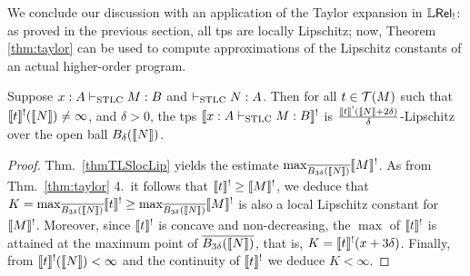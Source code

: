%
%
%


We conclude our discussion with an application of the Taylor expansion in $\mathbb{L} \mathsf{Rel}_{!}$: as proved in the previous section, all tps are locally Lipschitz; now, Theorem \ref{thm:taylor} can be used to compute approximations of the Lipschitz constants of an actual higher-order program.

\begin{corollary}\label{cor:taylor}
Suppose $x: A \vdash_{\mathrm{STLC}}M:B$ and $\vdash_{\mathrm{STLC}} N:A$. 
Then for all $t\in \mathcal{T}(M)$ such that $\llbracket t\rrbracket^{!}(\llbracket N\rrbracket)\neq \infty$, and $\delta>0$, the tps $\llbracket x:A\vdash_{\mathrm{STLC}}M:B\rrbracket^{!}$ is $\frac{\llbracket t\rrbracket^{!}(\llbracket N\rrbracket+2\delta)}{\delta}$-Lipschitz over the open ball
 $B_{\delta}(\llbracket N\rrbracket)$.
\end{corollary}
\begin{proof}
Thm.~\ref{thmTLSlocLip} yields the estimate $\max_{\overline{B_{3\delta}(\llbracket N\rrbracket)}}\llbracket M\rrbracket^{!}$. As from Thm.~\ref{thm:taylor} 4.~it follows that $\llbracket t\rrbracket^{!}\geq \llbracket M\rrbracket^{!}$, we deduce that $K=\max_{\overline{B_{3\delta}(\llbracket N\rrbracket)}}\llbracket t\rrbracket^{!}\geq \max_{\overline{B_{3\delta}(\llbracket N\rrbracket)}}\llbracket M\rrbracket^{!}$ is also a local Lipschitz constant for $\llbracket M\rrbracket^{!}$. Moreover, since $\llbracket t\rrbracket^{!}$ is concave and non-decreasing, the $\max$ of $\llbracket t\rrbracket^{!}$ is attained at the maximum point of $\overline{B_{3\delta}(\llbracket N\rrbracket)}$, that is, 
$K= \llbracket t\rrbracket^{!}(x+3\delta)$. Finally, from $\llbracket t\rrbracket^{!}(\llbracket N\rrbracket)<\infty$ and the continuity of $\llbracket t\rrbracket^{!}$ we deduce $K<\infty$.
\end{proof}

